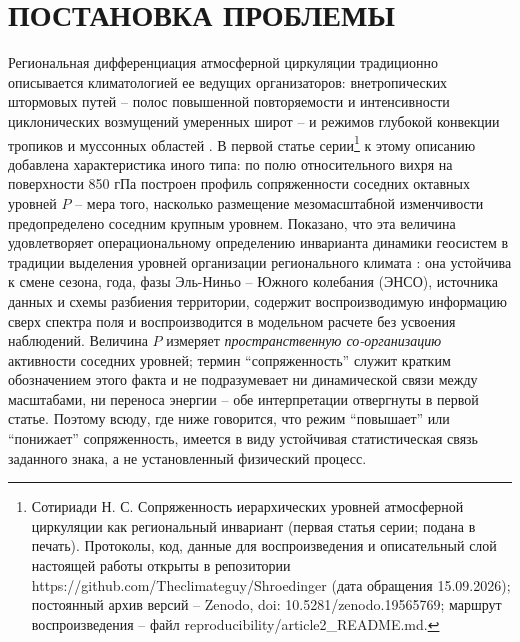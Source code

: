\documentclass[12pt,a4paper]{article}
\begin{document}
\section{ПОСТАНОВКА ПРОБЛЕМЫ}

Региональная дифференциация атмосферной циркуляции традиционно описывается климатологией ее ведущих организаторов: внетропических штормовых путей -- полос повышенной повторяемости и интенсивности циклонических возмущений умеренных широт \cite{HoskinsValdes1990,Chang2002,HoskinsHodges2005,Shaw2016} -- и режимов глубокой конвекции тропиков и муссонных областей \cite{Houze2004,Feng2021}. В первой статье серии\footnote{Сотириади Н. С. Сопряженность иерархических уровней атмосферной циркуляции как региональный инвариант (первая статья серии; подана в печать). Протоколы, код, данные для воспроизведения и описательный слой настоящей работы открыты в репозитории https://github.com/Theclimateguy/Shroedinger (дата обращения 15.09.2026); постоянный архив версий -- Zenodo, doi: 10.5281/zenodo.19565769; маршрут воспроизведения -- файл reproducibility/article2\_README.md.} к этому описанию добавлена характеристика иного типа: по полю относительного вихря на поверхности 850 гПа построен профиль сопряженности соседних октавных уровней $P$ -- мера того, насколько размещение мезомасштабной изменчивости предопределено соседним крупным уровнем. Показано, что эта величина удовлетворяет операциональному определению инварианта динамики геосистем \cite{Puzachenko1986,Puzachenko2004,Puzachenko2010} в традиции выделения уровней организации регионального климата \cite{Krenke2019}: она устойчива к смене сезона, года, фазы Эль-Ниньо -- Южного колебания (ЭНСО), источника данных \cite{Gelaro2017} и схемы разбиения территории, содержит воспроизводимую информацию сверх спектра поля и воспроизводится в модельном расчете без усвоения наблюдений. Величина $P$ измеряет \emph{пространственную со-организацию} активности соседних уровней; термин “сопряженность” служит кратким обозначением этого факта и не подразумевает ни динамической связи между масштабами, ни переноса энергии -- обе интерпретации отвергнуты в первой статье. Поэтому всюду, где ниже говорится, что режим “повышает” или “понижает” сопряженность, имеется в виду устойчивая статистическая связь заданного знака, а не установленный физический процесс.
\end{document}
